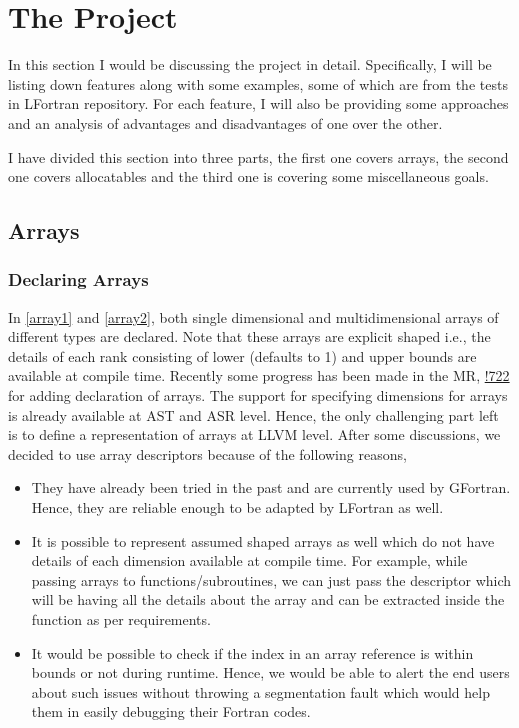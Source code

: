 \section{The Project}

In this section I would be discussing the project in detail. Specifically, I will be listing down features along with some examples, some of which are from the tests in LFortran repository. For each feature, I will also be providing some approaches and an analysis of advantages and disadvantages of one over the other.

I have divided this section into three parts, the first one covers arrays, the second one covers allocatables and the third one is covering some miscellaneous goals.

\subsection{Arrays}

\subsubsection{Declaring Arrays}

In \ref{array1} and \ref{array2}, both single dimensional and multidimensional arrays of different types are declared. Note that these arrays are explicit shaped i.e., the details of each rank consisting of lower (defaults to 1) and upper bounds are available at compile time. Recently some progress has been made in the MR, \href{https://gitlab.com/lfortran/lfortran/-/merge\_requests/722}{!722} for adding declaration of arrays. The support for specifying dimensions for arrays is already available at AST and ASR level. Hence, the only challenging part left is to define a representation of arrays at LLVM level. After some discussions, we decided to use array descriptors because of the following reasons,

\begin{itemize}

\item They have already been tried in the past and are currently used by GFortran. Hence, they are reliable enough to be adapted by LFortran as well.

\item It is possible to represent assumed shaped arrays as well which do not have details of each dimension available at compile time. For example, while passing arrays to functions/subroutines, we can just pass the descriptor which will be having all the details about the array and can be extracted inside the function as per requirements.

\item It would be possible to check if the index in an array reference is within bounds or not during runtime. Hence, we would be able to alert the end users about such issues without throwing a segmentation fault which would help them in easily debugging their Fortran codes.

\end{itemize}

